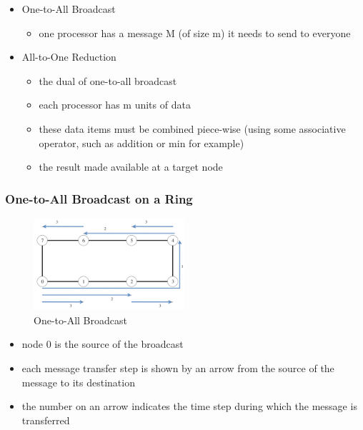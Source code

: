 \begin{itemize}
\tightlist
\item
  One-to-All Broadcast

  \begin{itemize}
  \tightlist
  \item
    one processor has a message M (of size m) it needs to send to
    everyone
  \end{itemize}
\item
  All-to-One Reduction

  \begin{itemize}
  \tightlist
  \item
    the dual of one-to-all broadcast
  \item
    each processor has m units of data
  \item
    these data items must be combined piece-wise (using some associative
    operator, such as addition or min for example)
  \item
    the result made available at a target node
  \end{itemize}
\end{itemize}

\hypertarget{one-to-all-broadcast-on-a-ring}{%
\subsubsection{One-to-All Broadcast on a
Ring}\label{one-to-all-broadcast-on-a-ring}}

\begin{figure}[H]
\centering
\includegraphics[width=0.5\textwidth]{figures/one-to-all-broadcast.png}
\caption{One-to-All Broadcast}
\end{figure}

\begin{itemize}
\tightlist
\item
  node 0 is the source of the broadcast
\item
  each message transfer step is shown by an arrow from the source of the
  message to its destination
\item
  the number on an arrow indicates the time step during which the
  message is transferred
\end{itemize}

